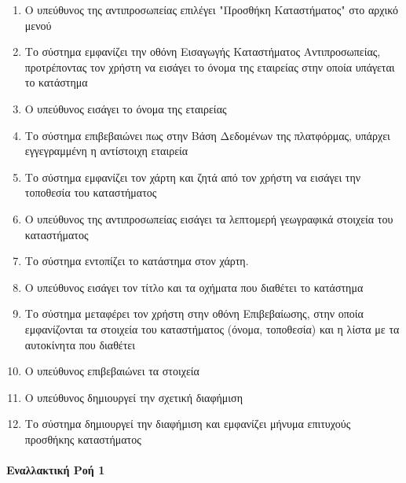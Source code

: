 \documentclass{../ol-softwaremanual}
\begin{document}
	\begin{enumerate}
		\item Ο υπεύθυνος της αντιπροσωπείας επιλέγει \en"\gr Προσθήκη Καταστήματος\en" \gr στο αρχικό μενού
		\item Το σύστημα εμφανίζει την οθόνη Εισαγωγής Καταστήματος Αντιπροσωπείας, προτρέποντας τον χρήστη να εισάγει το όνομα της εταιρείας στην οποία υπάγεται το κατάστημα
		\item Ο υπεύθυνος εισάγει το όνομα της εταιρείας
		\item Το σύστημα επιβεβαιώνει πως στην Βάση Δεδομένων της πλατφόρμας, υπάρχει εγγεγραμμένη η αντίστοιχη εταιρεία
		\item Το σύστημα εμφανίζει τον χάρτη και ζητά από τον χρήστη να εισάγει την τοποθεσία του καταστήματος
		\item Ο υπεύθυνος της αντιπροσωπείας εισάγει τα λεπτομερή γεωγραφικά στοιχεία του καταστήματος
		\item Το σύστημα εντοπίζει το κατάστημα στον χάρτη. 
		\item Ο υπεύθυνος εισάγει τον τίτλο και τα οχήματα που διαθέτει το κατάστημα
		\item Το σύστημα μεταφέρει τον χρήστη στην οθόνη Επιβεβαίωσης, στην οποία εμφανίζονται τα στοιχεία του καταστήματος (όνομα, τοποθεσία) και η λίστα με τα αυτοκίνητα που διαθέτει
		\item Ο υπεύθυνος επιβεβαιώνει τα στοιχεία
		\item Ο υπεύθυνος δημιουργεί την σχετική διαφήμιση
		\item Το σύστημα δημιουργεί την διαφήμιση και εμφανίζει μήνυμα επιτυχούς προσθήκης καταστήματος
	\end{enumerate}
	
	\paragraph{Εναλλακτική Ροή 1}
	
\end{document}
